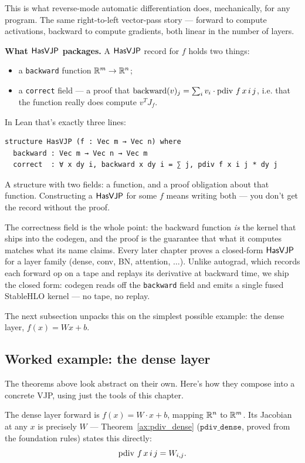 This is what reverse-mode automatic differentiation does, mechanically,
for any program. The same right-to-left vector-pass story --- forward
to compute activations, backward to compute gradients, both linear in
the number of layers.

\textbf{What \(\mathsf{HasVJP}\) packages.} A \(\mathsf{HasVJP}\) record for $f$ holds
two things:
\begin{itemize}
  \item a \texttt{backward} function $\mathbb{R}^{m} \to \mathbb{R}^{n}$;
  \item a \texttt{correct} field --- a proof that
  $\mathrm{backward}(v)_j = \sum_i v_i \cdot \operatorname{pdiv}\, f\, x\, i\, j$,
  i.e. that the function really does compute $v^T J_f$.
\end{itemize}
In Lean that's exactly three lines:
\begin{verbatim}
structure HasVJP (f : Vec m → Vec n) where
  backward : Vec m → Vec n → Vec m
  correct  : ∀ x dy i, backward x dy i = ∑ j, pdiv f x i j * dy j
\end{verbatim}
A structure with two fields: a function, and a proof obligation about
that function. Constructing a \(\mathsf{HasVJP}\) for some $f$ means writing
both --- you don't get the record without the proof.

The correctness field is the whole point: the backward function
\emph{is} the kernel that ships into the codegen, and the proof is the
guarantee that what it computes matches what its name claims. Every
later chapter proves a closed-form \(\mathsf{HasVJP}\) for a layer family
(dense, conv, BN, attention, $\ldots$). Unlike autograd, which records
each forward op on a tape and replays its derivative at backward time,
we ship the closed form: codegen reads off the \texttt{backward}
field and emits a single fused StableHLO kernel --- no tape, no
replay.

The next subsection unpacks this on the simplest possible example: the
dense layer, $f(x) = W x + b$.

\subsection*{Worked example: the dense layer}

The theorems above look abstract on their own. Here's how they
compose into a concrete VJP, using just the tools of this chapter.

The dense layer forward is $f(x) = W \cdot x + b$, mapping $\mathbb{R}^{n}$
to $\mathbb{R}^{m}$. Its Jacobian at any $x$ is precisely $W$ ---
Theorem~\ref{ax:pdiv_dense} (\(\texttt{pdiv\_dense}\), proved
from the foundation rules) states this directly:
\[
  \operatorname{pdiv}\, f\, x\, i\, j = W_{i,j}.
\]

